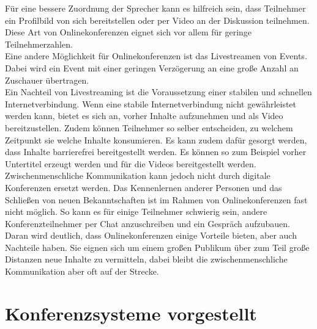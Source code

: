 Für eine bessere Zuordnung der Sprecher kann es hilfreich sein, dass Teilnehmer ein Profilbild von sich bereitstellen oder per Video an der Diskussion teilnehmen.
Diese Art von Onlinekonferenzen eignet sich vor allem für geringe Teilnehmerzahlen.
\autocite[Vgl.][]{M_Sladek.2020}
\\
Eine andere Möglichkeit für Onlinekonferenzen ist das Livestreamen von Events.
Dabei wird ein Event mit einer geringen Verzögerung an eine große Anzahl an Zuschauer übertragen.
\autocite[Vgl.][]{M_Sladek.2020}
\\
Ein Nachteil von Livestreaming ist die Voraussetzung einer stabilen und schnellen Internetverbindung.
\autocite[Vgl.][]{M_Maciej.2016}
Wenn eine stabile Internetverbindung nicht gewährleistet werden kann, bietet es sich an, vorher Inhalte aufzunehmen und als Video bereitzustellen.
Zudem können Teilnehmer so selber entscheiden, zu welchem Zeitpunkt sie welche Inhalte konsumieren.
Es kann zudem dafür gesorgt werden, dass Inhalte barrierefrei bereitgestellt werden.
Es können so zum Beispiel vorher Untertitel erzeugt werden und für die Videos bereitgestellt werden.
\autocite[Vgl.][]{M_Sladek.2020}
\\
Zwischenmenschliche Kommunikation kann jedoch nicht durch digitale Konferenzen ersetzt werden.
Das Kennenlernen anderer Personen und das Schließen von neuen Bekanntschaften ist im Rahmen von Onlinekonferenzen fast nicht möglich.
So kann es für einige Teilnehmer schwierig sein, andere Konferenzteilnehmer per Chat anzuschreiben und ein Gespräch aufzubauen.
\autocite[Vgl.][]{M_Sladek.2020}
\\
Daran wird deutlich, dass Onlinekonferenzen einige Vorteile bieten, aber auch Nachteile haben.
Sie eignen sich um einem großen Publikum über zum Teil große Distanzen neue Inhalte zu vermitteln, dabei bleibt die zwischenmenschliche Kommunikation aber oft auf der Strecke.

\section{Konferenzsysteme vorgestellt}
\label{sec:konferenzsysteme_vorgestellt}
